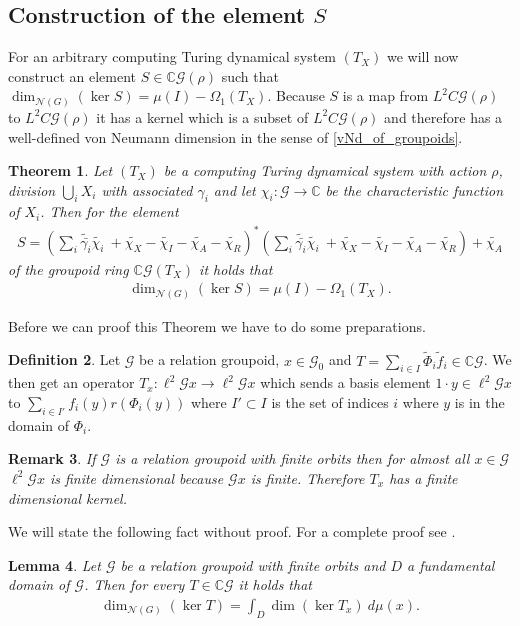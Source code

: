 \documentclass[12pt,a4paper]{scrartcl}
\theoremstyle{plain}
\newtheorem{Theorem}{Theorem}[section]
\newtheorem{Lemma}[Theorem]{Lemma}
\newtheorem{Remark}[Theorem]{Remark}
\theoremstyle{definition}
\newtheorem{Definition}[Theorem]{Definition}
\numberwithin{equation}{section}
\newcommand{\C}{\mathbb{C}} %
\newcommand{\2}{\mathbb{Z} / 2 \mathbb{Z}}
\newcommand{\G}{\mathcal{G}}
\newcommand{\1}{\bar{1}}
\newcommand{\0}{\bar{0}}
\begin{document}
\subsection{Construction of the element $S$}
For an arbitrary computing Turing dynamical system $(T_X)$ we will now construct an element $S \in \C \G (\rho)$ such that $\dim_{\mathcal{N}(G)}(\ker S) = \mu(I) - \Omega_1(T_X)$. Because $S$ is a map from $L^2C \G (\rho)$ to $L^2C \G (\rho)$ it has a kernel which is a subset of $L^2C \G (\rho)$ and therefore has a well-defined von Neumann dimension in the sense of \ref{vNd_of_groupoids}.


\begin{Theorem} \label{groserSatz}
	Let $(T_X)$ be a computing Turing dynamical system with action $\rho$, division $\bigcup_i X_i$ with associated $\gamma_i$ and let $\chi_i \colon\G \to \C$ be the characteristic function of $X_i$. Then for the element
	\begin{align*}
		S = (\sum_{i} \tilde{\bar{\gamma_i}} \tilde{\chi_i} \ + \tilde{\chi_X} - \tilde{\chi_I} - \tilde{\chi_A} - \tilde{\chi_R})^*(\sum_{i} \tilde{\bar{\gamma_i}} \tilde{\chi_i} \ + \tilde{\chi_X} - \tilde{\chi_I} - \tilde{\chi_A} - \tilde{\chi_R}) + \tilde{\chi_A}
	\end{align*}
	of the groupoid ring $\C \G(T_X)$ it holds that
	\begin{align*}
		\dim_{\mathcal{N}(G)}(\ker S) = \mu(I) - \Omega_1(T_X).
	\end{align*}
\end{Theorem}
Before we can proof this Theorem we have to do some preparations. 
\begin{Definition}
	Let $\G$ be a relation groupoid, $x \in \G_0$ and $T = \sum_{i \in I} \tilde \Phi_i\tilde f_i \in \C\G$. We then get an operator $T_x\colon\ell^2\G x \to \ell^2\G x$ which sends a basis element $1 \cdot y \in \ell^2\G x$ to $\sum_{i \in I'} f_i(y) r(\Phi_i(y)) $ where $I' \subset I$ is the set of indices $i$ where $y$ is in the domain of $\Phi_i$. 
\end{Definition}
\begin{Remark}
	If $\G$ is a relation groupoid with finite orbits then for almost all $x \in \G$ $\ell^2\G x$ is finite dimensional because $\G x$ is finite. Therefore $T_x$ has a finite dimensional kernel.
\end{Remark}
We will state the following fact without proof. For a complete proof see \cite{GRAB}.
\begin{Lemma} \label{T_to_Tx}
	Let $\G$ be a relation groupoid with finite orbits and $D$ a fundamental domain of $\G$. Then for every $T \in \C \G$ it holds that
	\begin{align*}
		\dim_{\mathcal{N}(G)}(\ker T) = \int_D \dim (\ker T_x) \ d \mu (x).
	\end{align*} 
\end{Lemma}
\end{document}
